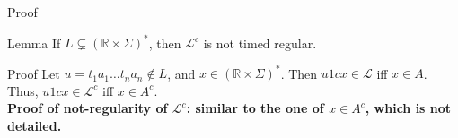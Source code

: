 \begin{frame}{Proof}

	\begin{block}{Lemma}
		If $L \subsetneq (\mathbb{R}\times\Sigma)^*$, then $\mathcal{L}^c$ is not timed regular.
	\end{block}
	
	\begin{block}{Proof}
	Let $u = t_1 a_1 \dots t_n a_n \not\in L$, and $x \in (\mathbb{R}\times\Sigma)^*$. Then $u 1 c x \in \mathcal{L}$ iff $x \in A$. Thus, $u 1 c x \in \mathcal{L}^c$ iff $x \in A^c$.\\
	\textbf{Proof of not-regularity of $\mathcal{L}^c$: similar to the one of $x \in A^c$, which is not detailed.}
	\end{block}

\end{frame}
